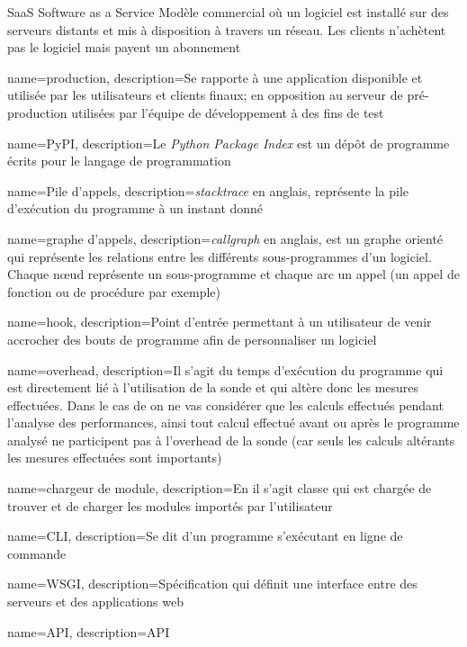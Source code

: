 \usepackage{xparse}
 {
}

  {SaaS}            %
  {Software as a Service}  %
  {Modèle commercial o\`u un logiciel est installé sur des serveurs distants et mis à disposition à travers un réseau. Les clients n'achètent pas le logiciel mais payent un abonnement} %

{
  name=production,
  description=Se rapporte à une application disponible et utilisée par les utilisateurs et clients finaux; en opposition au serveur de pré-production utilisées par l'équipe de développement à des fins de test
}
 
{
  name=PyPI,
  description=Le \emph{Python Package Index} est un dépôt de programme écrits pour le langage de programmation \Python
}
 
{
  name=Pile d'appels,
  description={\emph{stacktrace} en anglais, représente la pile d'exécution du programme à un instant donné}
}
 
{
  name=graphe d'appels,
  description={\emph{callgraph} en anglais, est un graphe orienté qui représente les relations entre les différents sous-programmes d'un logiciel. Chaque nœud représente un sous-programme et chaque arc un appel (un appel de fonction ou de procédure par exemple)}
}
 
{
  name=hook,
  description=Point d'entrée permettant à un utilisateur de venir accrocher des bouts de programme afin de personnaliser un logiciel
}
 
{
  name=overhead,
  description={Il s'agit du temps d'exécution du programme qui est directement lié à l'utilisation de la sonde et qui altère donc les mesures effectuées. Dans le cas de \Blackfire on ne vas considérer que les calculs effectués pendant l'analyse des performances, ainsi tout calcul effectué avant ou après le programme analysé ne participent pas à l'overhead de la sonde (car seuls les calculs altérants les mesures effectuées sont importants)}
}
 
{
  name=chargeur de module,
  description={En \Python il s'agit classe qui est chargée de trouver et de charger les modules importés par l'utilisateur}
}
 
{
  name=CLI,
  description=Se dit d'un programme s'exécutant en ligne de commande
}
 
{
  name=WSGI,
  description=Spécification qui définit une interface entre des serveurs et des applications web \Python
}
 
{
  name=API,
  description=API
}